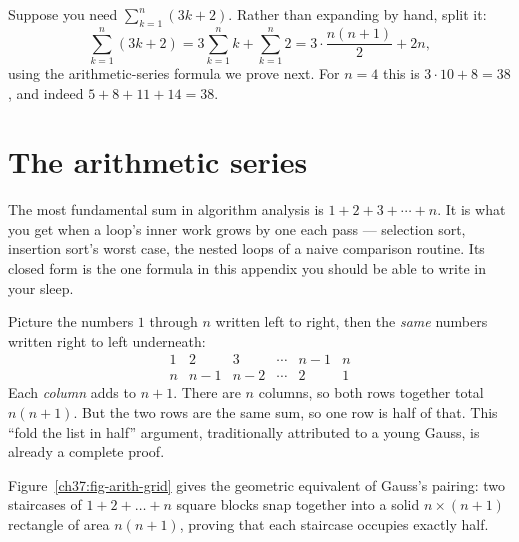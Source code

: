 \begin{example}
\label{ch37:ex-linearity}
Suppose you need $\sum_{k=1}^{n}(3k + 2)$. Rather than expanding by hand,
split it:
\[
  \sum_{k=1}^{n}(3k+2) = 3\sum_{k=1}^{n} k + \sum_{k=1}^{n} 2
                       = 3\cdot\frac{n(n+1)}{2} + 2n,
\]
using the arithmetic-series formula we prove next. For $n=4$ this is
$3\cdot 10 + 8 = 38$, and indeed $5+8+11+14 = 38$.
\end{example}

\section{The arithmetic series}
\label{ch37:arithmetic}

The most fundamental sum in algorithm analysis is $1 + 2 + 3 + \cdots + n$. It is
what you get when a loop's inner work grows by one each pass --- selection sort,
insertion sort's worst case, the nested loops of a naive comparison routine. Its
closed form is the one formula in this appendix you should be able to write in
your sleep.

\begin{intuitionbox}
Picture the numbers $1$ through $n$ written left to right, then the \emph{same}
numbers written right to left underneath:
\[
\begin{array}{cccccc}
 1 & 2 & 3 & \cdots & n-1 & n \\
 n & n-1 & n-2 & \cdots & 2 & 1
\end{array}
\]
Each \emph{column} adds to $n+1$. There are $n$ columns, so both rows together
total $n(n+1)$. But the two rows are the same sum, so one row is half of that.
This ``fold the list in half'' argument, traditionally attributed to a young
Gauss, is already a complete proof.
\end{intuitionbox}

Figure~\ref{ch37:fig-arith-grid} gives the geometric equivalent of Gauss's pairing:
two staircases of $1 + 2 + \dots + n$ square blocks snap together into a solid
$n \times (n+1)$ rectangle of area $n(n+1)$, proving that each staircase occupies
exactly half.


